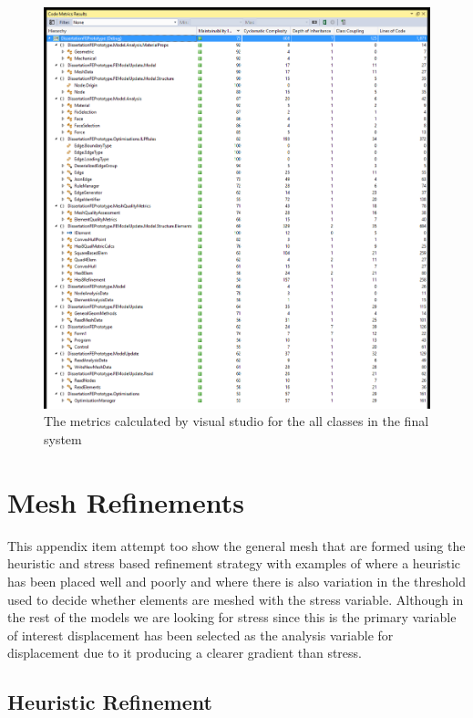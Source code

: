 \begin{figure}[H]
  \centerline{\includegraphics[width=165mm, scale=0.5]{../Graphics/qualityMetricsExpanded.png}}
  \caption{The metrics calculated by visual studio for the all classes in the final system}
\end{figure}


\section{Mesh Refinements}
This appendix item attempt too show the general mesh that are formed using the heuristic and stress based refinement strategy with examples of where a heuristic has been placed well and poorly and where there is also variation in the threshold used to decide whether elements are meshed with the stress variable. Although in the rest of the models we are looking for stress since this is the primary variable of interest displacement has been selected as the analysis variable for displacement due to it producing a clearer gradient than stress.


\subsection{Heuristic Refinement}



